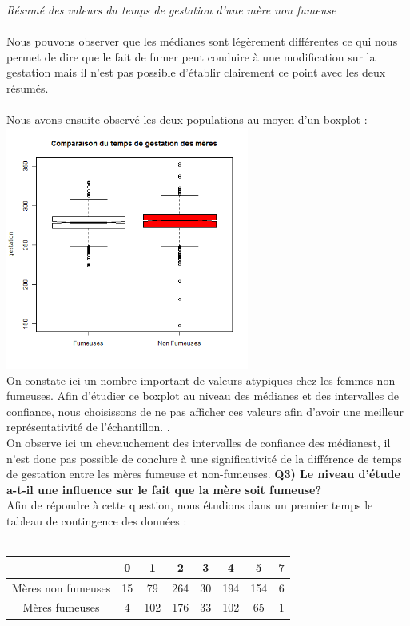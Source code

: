 ﻿\documentclass[a4paper, 9pt]{article}
\begin{document}
\textit{R\'esum\'e des valeurs du temps de gestation d'une m\`ere non fumeuse}\\ \\
Nous pouvons observer que les m\'edianes sont l\'eg\`erement diff\'erentes ce qui nous permet de dire que le fait de fumer peut conduire \`a
une modification sur la gestation mais il n'est pas possible d'établir clairement ce point avec les deux r\'esum\'es.\\ \\
Nous avons ensuite observ\'e les deux populations au moyen d'un boxplot :\\
\includegraphics[height = 8cm, width = 8cm]{plots/boxplot_gestation_smoke.png}\\
On constate ici un nombre important de valeurs atypiques chez les femmes non-fumeuses.
Afin d'\'etudier ce boxplot au niveau des m\'edianes et des intervalles de confiance, nous choisissons de ne pas afficher ces valeurs afin d’avoir une meilleur représentativité de l’échantillon.
.\\
On observe ici un chevauchement des intervalles de confiance des m\'edianest, il n'est donc pas possible de conclure à une significativité de la différence de temps de gestation entre les mères fumeuse et non-fumeuses.
\newpage
\textbf{Q3) Le niveau d’étude a-t-il une influence sur le fait que la mère soit fumeuse?}\\
Afin de r\'epondre \`a cette question, nous \'etudions dans un premier temps le tableau de contingence des donn\'ees :\\ \\
\begin{tabular}{|c|c|c|c|c|c|c|c|}
\hline
 & 0 & 1 & 2 & 3 & 4 & 5 & 7\\
\hline
M\`eres non fumeuses & 15 & 79 & 264 & 30 & 194 & 154 & 6 \\
\hline
M\`eres fumeuses & 4 & 102 & 176 & 33 & 102 & 65 & 1 \\
\hline
\end{tabular}\\
\end{document}
